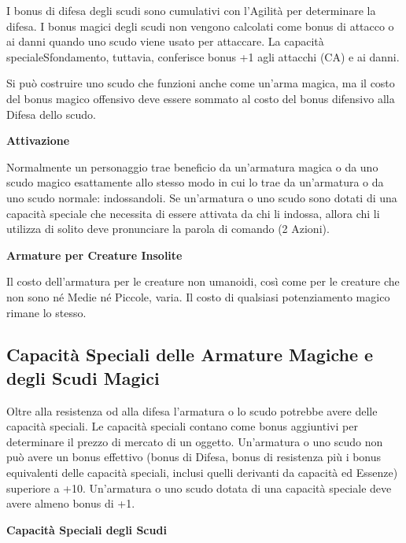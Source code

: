 \documentclass[a4paper,11pt,twoside,openany]{book}
\begin{document}
\label{scudi-magici}

I bonus di difesa degli scudi sono cumulativi con l'Agilità per determinare la difesa. I bonus magici degli scudi non vengono calcolati come bonus di attacco o ai danni quando uno scudo viene usato per attaccare. La capacità specialeSfondamento, tuttavia, conferisce bonus +1 agli attacchi (CA) e ai danni.

Si può costruire uno scudo che funzioni anche come un'arma magica, ma il costo del bonus magico offensivo deve essere sommato al costo del bonus difensivo alla Difesa dello scudo.

\textbf{Attivazione}

Normalmente un personaggio trae beneficio da un'armatura magica o da uno scudo magico esattamente allo stesso modo in cui lo trae da un'armatura o da uno scudo normale: indossandoli. Se un'armatura o uno scudo sono dotati di una capacità speciale che necessita di essere attivata da chi li indossa, allora chi li utilizza di solito deve pronunciare la parola di comando (2 Azioni).

\textbf{Armature per Creature Insolite}

Il costo dell'armatura per le creature non umanoidi, così come per le creature che non sono né Medie né Piccole, varia. Il costo di qualsiasi potenziamento magico rimane lo stesso.



\subsection{Capacità Speciali delle Armature Magiche e degli Scudi Magici}

\label{capacita-speciali-delle-armature-magiche-e-degli-scudi-magici}

Oltre alla resistenza od alla difesa l'armatura o lo scudo potrebbe avere delle capacità speciali. Le capacità speciali contano come bonus aggiuntivi per determinare il prezzo di mercato di un oggetto. Un'armatura o uno scudo non può avere un bonus effettivo (bonus di Difesa, bonus di resistenza più i bonus equivalenti delle capacità speciali, inclusi quelli derivanti da capacità ed Essenze) superiore a +10. Un'armatura o uno scudo dotata di una capacità speciale deve avere almeno bonus di +1.

\bigskip

\textbf{Capacità Speciali degli Scudi}

\medskip
\end{document}

